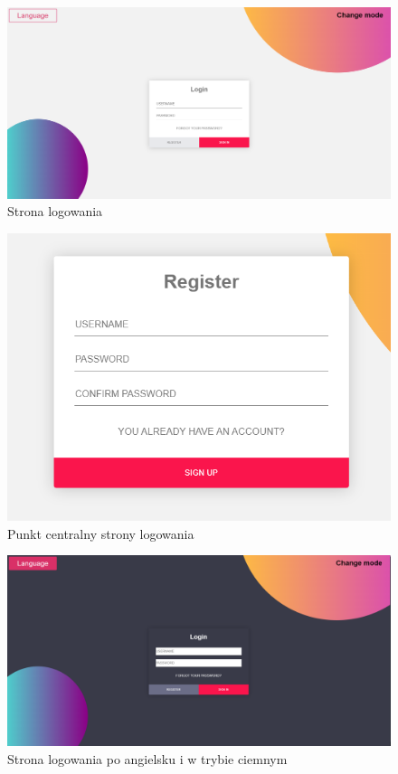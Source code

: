 \documentclass[a4paper,12pt, twoside]{book} %
\begin{document}
\begin{figure}[h]
	\centering
	\includegraphics[scale=0.31]{login_page.png}
	\caption{Strona logowania}
\end{figure}

\begin{figure}[h]
	\centering
	\includegraphics[scale=0.31]{register.png}
	\caption{Punkt centralny strony logowania}
\end{figure}

\begin{figure}[h]
	\centering
	\includegraphics[scale=0.31]{dark_en.png}
	\caption{Strona logowania po angielsku i w trybie ciemnym}
\end{figure}
\end{document}
